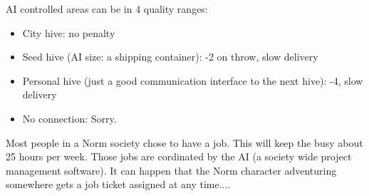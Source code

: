 AI controlled areas can be in 4 quality ranges:

\begin{itemize}
    \item City hive: no penalty
    \item Seed hive (AI size: a shipping container): -2 on throw, slow delivery
    \item Personal hive (just a good communication interface to the next hive): -4, slow delivery
    \item No connection: Sorry.    
\end{itemize}

Most people in a Norm society chose to have a job. This will keep the busy about 25 hours per week. Those jobs are cordinated by the AI (a society wide project management software). It can happen that the Norm character adventuring somewhere gets a job ticket assigned at any time....

